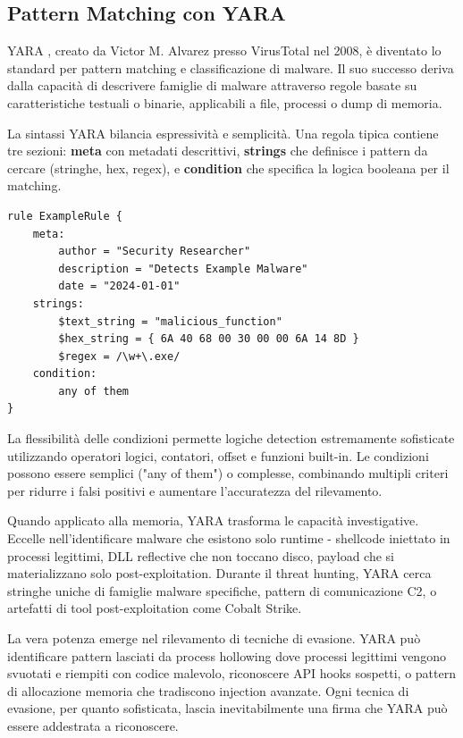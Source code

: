 \subsection{Pattern Matching con YARA}

YARA \cite{yara2024}, creato da Victor M. Alvarez presso VirusTotal nel 2008, è diventato lo standard per pattern matching e classificazione di malware. Il suo successo deriva dalla capacità di descrivere famiglie di malware attraverso regole basate su caratteristiche testuali o binarie, applicabili a file, processi o dump di memoria.

La sintassi YARA bilancia espressività e semplicità. Una regola tipica contiene tre sezioni: \textbf{meta} con metadati descrittivi, \textbf{strings} che definisce i pattern da cercare (stringhe, hex, regex), e \textbf{condition} che specifica la logica booleana per il matching. 

\begin{verbatim}
rule ExampleRule {
    meta:
        author = "Security Researcher"
        description = "Detects Example Malware"
        date = "2024-01-01" 
    strings:
        $text_string = "malicious_function"
        $hex_string = { 6A 40 68 00 30 00 00 6A 14 8D }
        $regex = /\w+\.exe/
    condition:
        any of them
}
\end{verbatim}

La flessibilità delle condizioni permette logiche detection estremamente sofisticate utilizzando operatori logici, contatori, offset e funzioni built-in. Le condizioni possono essere semplici ("any of them") o complesse, combinando multipli criteri per ridurre i falsi positivi e aumentare l'accuratezza del rilevamento.

Quando applicato alla memoria, YARA trasforma le capacità investigative. Eccelle nell'identificare malware che esistono solo runtime - shellcode iniettato in processi legittimi, DLL reflective che non toccano disco, payload che si materializzano solo post-exploitation. Durante il threat hunting, YARA cerca stringhe uniche di famiglie malware specifiche, pattern di comunicazione C2, o artefatti di tool post-exploitation come Cobalt Strike.

La vera potenza emerge nel rilevamento di tecniche di evasione. YARA può identificare pattern lasciati da process hollowing dove processi legittimi vengono svuotati e riempiti con codice malevolo, riconoscere API hooks sospetti, o pattern di allocazione memoria che tradiscono injection avanzate. Ogni tecnica di evasione, per quanto sofisticata, lascia inevitabilmente una firma che YARA può essere addestrata a riconoscere.


